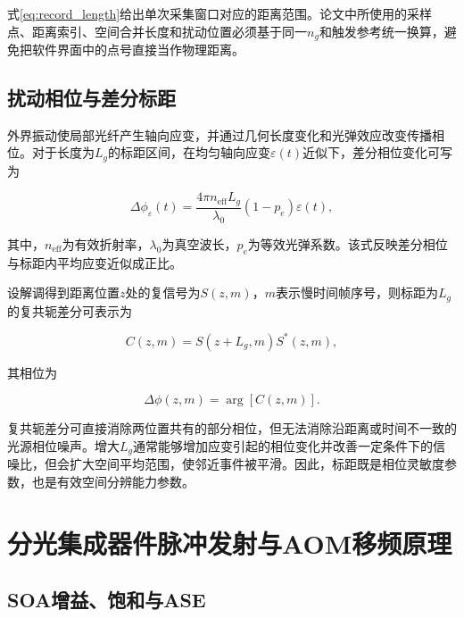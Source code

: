 式\eqref{eq:record_length}给出单次采集窗口对应的距离范围。论文中所使用的采样点、距离索引、空间合并长度和扰动位置必须基于同一$n_g$和触发参考统一换算，避免把软件界面中的点号直接当作物理距离。

\subsection{扰动相位与差分标距}

外界振动使局部光纤产生轴向应变，并通过几何长度变化和光弹效应改变传播相位。对于长度为$L_g$的标距区间，在均匀轴向应变$\varepsilon(t)$近似下，差分相位变化可写为

\begin{equation}
\Delta\phi_\varepsilon(t)
=
\frac{4\pi n_{\mathrm{eff}}L_g}{\lambda_0}
\left(1-p_e\right)
\varepsilon(t),
\label{eq:strain_phase}
\end{equation}

其中，$n_{\mathrm{eff}}$为有效折射率，$\lambda_0$为真空波长，$p_e$为等效光弹系数。该式反映差分相位与标距内平均应变近似成正比\cite{posey2000strain,liokumovich2015fundamentals,bhatta2019dynamic}。

设解调得到距离位置$z$处的复信号为$S(z,m)$，$m$表示慢时间帧序号，则标距为$L_g$的复共轭差分可表示为

\begin{equation}
C(z,m)
=
S(z+L_g,m)S^*(z,m),
\label{eq:complex_difference}
\end{equation}

其相位为

\begin{equation}
\Delta\phi(z,m)
=
\arg\left[C(z,m)\right].
\label{eq:differential_phase}
\end{equation}

复共轭差分可直接消除两位置共有的部分相位，但无法消除沿距离或时间不一致的光源相位噪声。增大$L_g$通常能够增加应变引起的相位变化并改善一定条件下的信噪比，但会扩大空间平均范围，使邻近事件被平滑。因此，标距既是相位灵敏度参数，也是有效空间分辨能力参数\cite{qian2025drift,yang2022digitalized}。

\section{分光集成器件脉冲发射与AOM移频原理}

\subsection{SOA增益、饱和与ASE}


